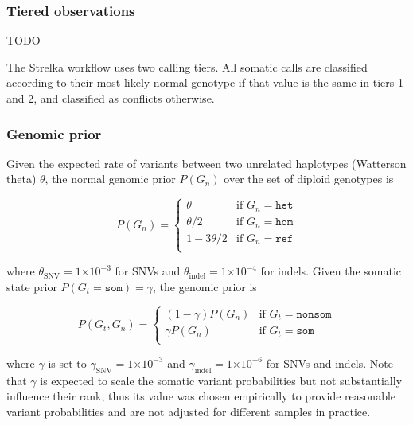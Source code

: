 \documentclass{article}
\newcommand{\e}[1]{\ensuremath{\times 10^{#1}}}
\begin{document}
\subsubsection{Tiered observations}
\label{sec:somatic_tiers}

TODO

The Strelka workflow uses two calling tiers. All somatic calls are classified according to their most-likely normal genotype if that value is the same in tiers 1 and 2, and classified as conflicts otherwise.

\subsubsection{Genomic prior}
Given the expected rate of variants between two unrelated haplotypes (Watterson theta) $\theta$, the normal genomic prior $P(G_n)$ over the set of diploid genotypes is

\begin{equation*}
P(G_n)=
\begin{cases}
	\theta & \text{if } G_n = \texttt{het} \\
	\theta/2 & \text{if } G_n = \texttt{hom} \\
	1 - 3\theta/2 & \text{if } G_n = \texttt{ref} \\
\end{cases}
\end{equation*}

\noindent where $\theta_{\text{SNV}}=1\e{-3}$ for SNVs and $\theta_{\text{indel}}=1\e{-4}$ for indels. Given the somatic state prior $P(G_t=\texttt{som}) = \gamma$, the genomic prior is

\begin{equation*}
P(G_t, G_n)=
\begin{cases}
	(1 - \gamma) P(G_n) & \text{if } G_t = \texttt{nonsom} \\
	\gamma P(G_n) & \text{if } G_t = \texttt{som} \\
\end{cases}
\end{equation*}

\noindent where $\gamma$ is set to $\gamma_{\text{SNV}} = 1\e{-3}$ and $\gamma_{\text{indel}} = 1\e{-6}$ for SNVs and indels. Note that $\gamma$ is expected to scale the somatic variant probabilities but not substantially influence their rank, thus its value was chosen empirically to provide reasonable variant probabilities and are not adjusted for different samples in practice.
\end{document}
